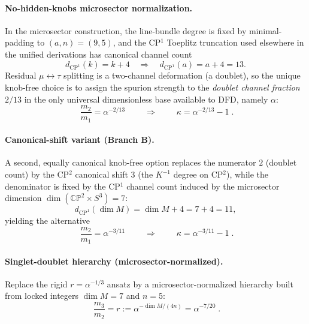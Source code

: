 \paragraph{No-hidden-knobs microsector normalization.}
In the microsector construction, the line-bundle degree is fixed by minimal-padding
to $(a,n)=(9,5)$, and the CP$^1$ Toeplitz truncation used elsewhere in the unified
derivations has canonical channel count
\begin{equation}
d_{\mathrm{CP}^1}(k)=k+4 \quad\Rightarrow\quad d_{\mathrm{CP}^1}(a)=a+4=13 .
\end{equation}
Residual $\mu\leftrightarrow\tau$ splitting is a two-channel deformation (a doublet),
so the unique knob-free choice is to assign the spurion strength to the \emph{doublet
channel fraction} $2/13$ in the only universal dimensionless base available to DFD,
namely $\alpha$:
\begin{equation}
\boxed{\; \frac{m_2}{m_1} = \alpha^{-2/13}\;}\qquad\Rightarrow\qquad
\boxed{\;\kappa = \alpha^{-2/13}-1\;}.
\end{equation}

\paragraph{Canonical-shift variant (Branch B).}
A second, equally canonical knob-free option replaces the numerator $2$ (doublet count)
by the CP$^2$ canonical shift $3$ (the $K^{-1}$ degree on CP$^2$), while the denominator
is fixed by the CP$^1$ channel count induced by the microsector dimension $\dim(\mathbb{CP}^2\times S^3)=7$:
\begin{equation}
d_{\mathrm{CP}^1}(\dim M)=\dim M + 4 = 7+4 = 11,
\end{equation}
yielding the alternative
\begin{equation}
\boxed{\; \frac{m_2}{m_1} = \alpha^{-3/11}\;}\qquad\Rightarrow\qquad
\boxed{\;\kappa = \alpha^{-3/11}-1\;}.
\end{equation}

\paragraph{Singlet-doublet hierarchy (microsector-normalized).}
Replace the rigid $r=\alpha^{-1/3}$ ansatz by a microsector-normalized hierarchy
built from locked integers $\dim M=7$ and $n=5$:
\begin{equation}
\boxed{\;\frac{m_3}{m_2} = r := \alpha^{-\dim M/(4n)} = \alpha^{-7/20}\;}.
\end{equation}


